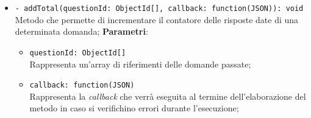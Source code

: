 \begin{itemize}
\begin{itemize}
\begin{itemize}
			\end{itemize}
	\item \texttt{- addTotal(questionId: ObjectId[], callback: function(JSON)): void} \\
	Metodo che permette di incrementare il contatore delle risposte date di una determinata domanda;
		\textbf{Parametri}:
			\begin{itemize}
				\item \texttt{questionId: ObjectId[]} \\
				Rappresenta un'array di riferimenti delle domande passate;
				\item \texttt{callback: function(JSON)} \\
				Rappresenta la \textit{callback} che verrà eseguita al termine dell'elaborazione del metodo in caso si verifichino errori durante l'esecuzione;
			\end{itemize}
	\end{itemize}
\end{itemize}
